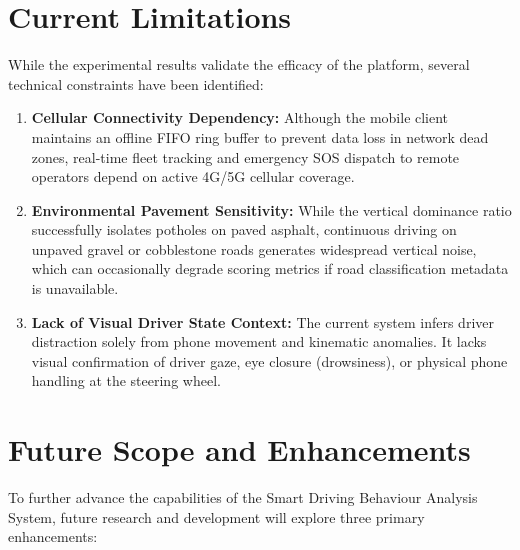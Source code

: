 \section{Current Limitations}
\label{sec:limitations}
While the experimental results validate the efficacy of the platform, several technical constraints have been identified:
\begin{enumerate}
    \item \textbf{Cellular Connectivity Dependency:} Although the mobile client maintains an offline FIFO ring buffer to prevent data loss in network dead zones, real-time fleet tracking and emergency SOS dispatch to remote operators depend on active 4G/5G cellular coverage.
    \item \textbf{Environmental Pavement Sensitivity:} While the vertical dominance ratio successfully isolates potholes on paved asphalt, continuous driving on unpaved gravel or cobblestone roads generates widespread vertical noise, which can occasionally degrade scoring metrics if road classification metadata is unavailable.
    \item \textbf{Lack of Visual Driver State Context:} The current system infers driver distraction solely from phone movement and kinematic anomalies. It lacks visual confirmation of driver gaze, eye closure (drowsiness), or physical phone handling at the steering wheel.
\end{enumerate}

\section{Future Scope and Enhancements}
\label{sec:future_scope}
To further advance the capabilities of the Smart Driving Behaviour Analysis System, future research and development will explore three primary enhancements:

